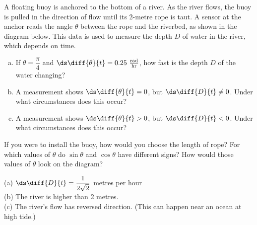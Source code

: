 \begin{Mquestion}
A floating buoy is anchored to the bottom of a river. As the river flows, the buoy is pulled in the direction of flow until its 2-metre rope is taut. A sensor at the anchor reads the angle $\theta$ between the rope and the riverbed, as shown in the diagram below. This data is used to measure the depth $D$ of water in the river, which depends on time.
\begin{center}
\end{center}
\begin{enumerate}[(a)]
\item If $\theta = \dfrac{\pi}{4}$ and $\ds\diff{\theta}{t}=0.25~\frac{\mathrm{rad}}{\mathrm{hr}}$, how fast is the depth $D$ of the water changing?
\item A measurement shows $\ds\diff{\theta}{t}=0$, but $\ds\diff{D}{t}\neq0$. Under what circumstances does this occur?
\item A measurement shows $\ds\diff{\theta}{t}>0$, but $\ds\diff{D}{t}<0$. Under what circumstances does this occur?
\end{enumerate}
\end{Mquestion}
\begin{hint}
If you were to install the buoy, how would you choose the length of rope? For which values of $\theta$ do $\sin\theta$ and $\cos\theta$ have different signs? How would those values of $\theta$ look on the diagram?
\end{hint}
\begin{answer}
(a) $\ds\diff{D}{t}=\dfrac{1}{2\sqrt{2}}$ metres per hour\\
(b) The river is higher than 2 metres.\\
(c) The river's flow has reversed direction. (This can happen near an ocean at high tide.)
\end{answer}
